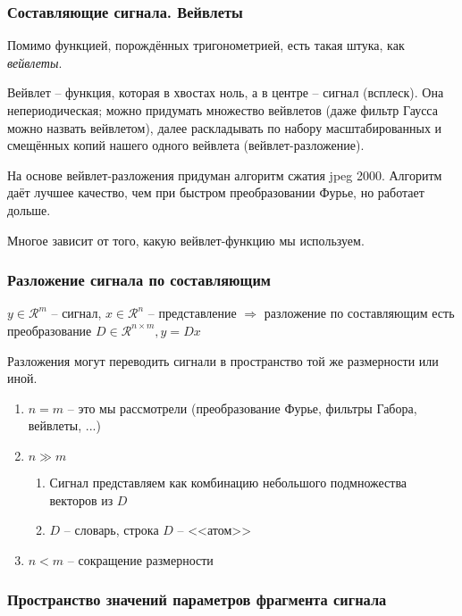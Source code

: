\documentclass[main.tex]{subfiles}
\begin{document}
\subsubsection{Составляющие сигнала. Вейвлеты}

Помимо функцией, порождённых тригонометрией, есть такая штука, как \emph{вейвлеты}.

Вейвлет -- функция, которая в хвостах ноль, а в центре -- сигнал (всплеск).
Она непериодическая; можно придумать множество вейвлетов (даже фильтр Гаусса можно назвать вейвлетом), далее раскладывать по набору масштабированных и смещённых копий нашего одного вейвлета (вейвлет-разложение).

На основе вейвлет-разложения придуман алгоритм сжатия jpeg 2000.
Алгоритм даёт лучшее качество, чем при быстром преобразовании Фурье, но работает дольше.

Многое зависит от того, какую вейвлет-функцию мы используем.

\subsubsection{Разложение сигнала по составляющим}

$ y \in \mathcal{R}^m $ -- сигнал, $ x \in \mathcal{R}^n $ -- представление $ \Rightarrow $ разложение по составляющим есть преобразование $ D \in \mathcal{R}^{n \times m}, y = Dx $

Разложения могут переводить сигнали в пространство той же размерности или иной.

\begin{enumerate}[noitemsep]
	\item $ n = m $ -- это мы рассмотрели (преобразование Фурье, фильтры Габора, вейвлеты, ...)
	\item $ n \gg m  $
	\begin{enumerate}[noitemsep]
		\item Сигнал представляем как комбинацию небольшого подмножества векторов из $ D $
		\item $ D $ -- словарь, строка $ D $ -- <<атом>>
	\end{enumerate}
	\item $ n < m $ -- сокращение размерности
\end{enumerate}

\subsubsection{Пространство значений параметров фрагмента сигнала}
\end{document}
